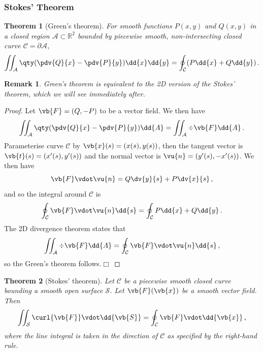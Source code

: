 \documentclass{article}
\theoremstyle{plain}\theoremheaderfont{\normalfont\itshape}\theorembodyfont{\rmfamily}\theoremseparator{.}\newtheorem*{rem}{Remark}\newtheorem*{ex}{Example}\newtheorem*{proof}{Proof}\newtheorem*{altp}{Alternative proof}
\theoremstyle{plain}\theoremheaderfont{\normalfont\bfseries}\theorembodyfont{\rmfamily}\theoremseparator{.}\newtheorem{thm}{Theorem}[section]\newtheorem{lem}[thm]{Lemma}\newtheorem{prop}[thm]{Proposition}\newtheorem*{cor}{Corollary}\newtheorem{defn}[thm]{Definition}\newtheorem{clm}[thm]{Claim}\newtheorem{clminproof}{Claim}
\theoremstyle{break}\theoremheaderfont{\normalfont\itshape}\theorembodyfont{\rmfamily}\theoremseparator{.\medskip}\newtheorem*{proofskip}{Proof}\newtheorem*{exs}{Examples}\newtheorem*{rems}{Remarks}
\theoremstyle{break}\theoremheaderfont{\normalfont\bfseries}\theorembodyfont{\rmfamily}\theoremseparator{.\medskip}\newtheorem{lemskip}[thm]{Lemma}\newtheorem{defnskip}[thm]{Definition}\newtheorem{propskip}[thm]{Proposition}\newtheorem{thmskip}[thm]{Theorem}
\numberwithin{equation}{section}
\newcommand{\qed}{\hfill\ensuremath{\Box}}
\begin{document}
	\subsubsection{Stokes' Theorem}	
	\begin{thm}[Green's theorem]	
		For smooth functions \(P(x,y)\) and \(Q(x,y)\) in a closed region \(\mathcal{A}\subset\mathbb{R}^2\) bounded by piecewise smooth, non-intersecting closed curve \(\mathcal{C}=\partial\mathcal{A}\),
		\[\iint_{\mathcal{A}}\qty(\pdv{Q}{x}-\pdv{P}{y})\dd{x}\dd{y}=\oint_{\mathcal{C}}(P\dd{x}+Q\dd{y})\,.\]
	\end{thm}
	\begin{rem}
		Green's theorem is equivalent to the 2D version of the Stokes' theorem, which we will see immediately after.
	\end{rem}
	\begin{proof}
		Let \(\vb{F}=(Q,-P)\) to be a vector field. We then have
		\[\iint_\mathcal{A}\qty(\pdv{Q}{x}-\pdv{P}{y})\dd{A}=\iint_\mathcal{A}\div\vb{F}\dd{A}\,.\]
		Parameterise curve \(\mathcal{C}\) by \(\vb{x}(s)=(x(s),y(s))\), then the tangent vector is \(\vb{t}(s)=(x'(s),y'(s))\) and the normal vector is \(\vu{n}=(y'(s),-x'(s))\). We then have
		\[\vb{F}\vdot\vu{n}=Q\dv{y}{s}+P\dv{x}{s}\,,\]
		and so the integral around \(\mathcal{C}\) is
		\[\oint_\mathcal{C}\vb{F}\vdot\vu{n}\dd{s}=\oint_\mathcal{C}P\dd{x}+Q\dd{y}\,.\]
		The 2D divergence theorem states that
		\[\iint_\mathcal{A}\div\vb{F}\dd{A}=\oint_\mathcal{C}\vb{F}\vdot\vu{n}\dd{s}\,,\]
		so the Green's theorem follows.\qed
	\end{proof}
	\begin{thm}[Stokes' theorem]\label{stokesthm}
		Let \(\mathcal{C}\) be a piecewise smooth closed curve bounding a smooth open surface \(\mathcal{S}\). Let \(\vb{F}(\vb{x})\) be a smooth vector field. Then
		\[\iint_{\mathcal{S}}\curl{\vb{F}}\vdot\dd{\vb{S}}=\oint_{\mathcal{C}}\vb{F}\vdot\dd{\vb{x}}\,,\]
		where the line integral is taken in the direction of \(\mathcal{C}\) as specified by the right-hand rule.
	\end{thm}
\end{document}
